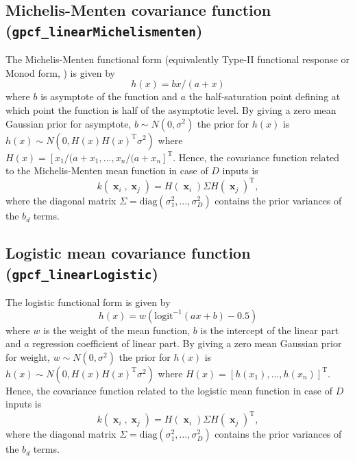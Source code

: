 \documentclass[twoside,11pt]{article}
\DeclareMathOperator{\x}{\mathbf{x}}
\newcommand{\code}[1]{{\normalfont\texttt{#1}}}
\begin{document}
\subsection*{Michelis-Menten covariance function  (\code{gpcf\_linearMichelismenten})}

The Michelis-Menten functional form (equivalently Type-II functional
response or Monod form, \citep{Kot:2001}) is given by
\begin{equation}
h(x) = bx / (a + x)
\end{equation}
where $b$ is asymptote of the function and $a$ the half-saturation 
point defining at which point the function is half of the asymptotic 
level. By giving a zero mean Gaussian prior for asymptote, $b \sim N(0, \sigma^2)$
the prior for $h(x)$ is $h(x) \sim N(0, H(x)H(x)^{\text{T}}\sigma^2)$ where 
$H(x) = [x_1/(a + x_1, ... , x_n/(a + x_n]^{\text{T}}$. Hence, the 
covariance function related to the Michelis-Menten mean function in case of $D$
 inputs is 
\begin{equation}\label{cf_linearMichelismenten}
k(\x_i,\x_j)= H(\x_i)\Sigma H(\x_j)^{\text{T}},
\end{equation}
where the diagonal matrix
$\Sigma=\text{diag}(\sigma_1^2,\ldots,\sigma_D^2)$ contains the
prior variances of the $b_d$ terms. 

\subsection*{Logistic mean covariance function  (\code{gpcf\_linearLogistic})}

The logistic functional form is given by
\begin{equation}
h(x) = w (\mathrm{logit}^{-1}(ax + b) - 0.5) 
\end{equation}
where $w$ is the weight of the mean function, $b$ is the intercept of the linear part 
and $a$ regression coefficient of linear part. By giving a zero mean Gaussian prior 
for weight, $w \sim N(0, \sigma^2)$
the prior for $h(x)$ is $h(x) \sim N(0, H(x)H(x)^{\text{T}}\sigma^2)$ where 
$H(x) = [h(x_1), ... , h(x_n)]^{\text{T}}$. Hence, the covariance function related 
to the logistic mean function in case of $D$ inputs is 
\begin{equation}\label{cf_linearlinearLogistic}
k(\x_i,\x_j)= H(\x_i)\Sigma H(\x_j)^{\text{T}},
\end{equation}
where the diagonal matrix
$\Sigma=\text{diag}(\sigma_1^2,\ldots,\sigma_D^2)$ contains the
prior variances of the $b_d$ terms. 
\end{document}
